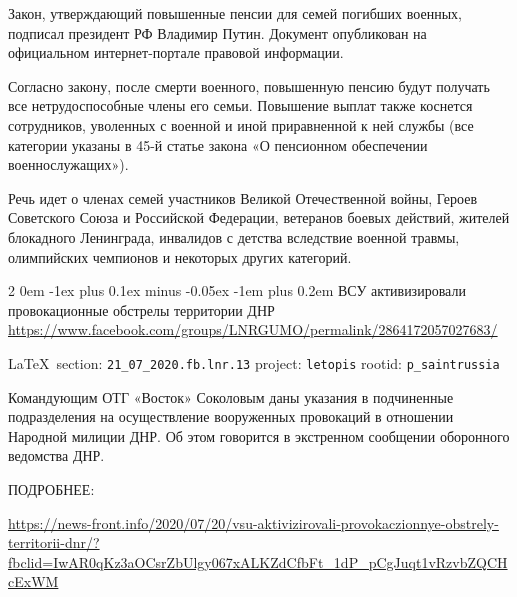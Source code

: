 \documentclass[a4paper,11pt]{extreport}
\makeatletter
\renewcommand\subsection{%
  \clearpage
    \@startsection{subsection}%
    {2}%
    {0em}%
    {-1ex plus 0.1ex minus -0.05ex}%
    {-1em plus 0.2em}%
    {\scshape\bfseries\Large}%
}
\makeatother
\begin{document}
Закон, утверждающий повышенные пенсии для семей погибших военных, подписал
президент РФ Владимир Путин. Документ опубликован на официальном
интернет-портале правовой информации.

Согласно закону, после смерти военного, повышенную пенсию будут получать все
нетрудоспособные члены его семьи.  Повышение выплат также коснется сотрудников,
уволенных с военной и иной приравненной к ней службы (все категории указаны в
45-й статье закона «О пенсионном обеспечении военнослужащих»).

Речь идет о членах семей участников Великой Отечественной войны, Героев
Советского Союза и Российской Федерации, ветеранов боевых действий, жителей
блокадного Ленинграда, инвалидов с детства вследствие военной травмы,
олимпийских чемпионов и некоторых других категорий.
  
 
 

\subsection{ВСУ активизировали провокационные обстрелы территории ДНР}
\label{sec:21_07_2020.fb.lnr.13}
\url{https://www.facebook.com/groups/LNRGUMO/permalink/2864172057027683/}
  
\vspace{0.5cm}
{\small\LaTeX~section: \verb|21_07_2020.fb.lnr.13| project: \verb|letopis| rootid: \verb|p_saintrussia|}
\vspace{0.5cm}

Командующим ОТГ «Восток» Соколовым даны указания в подчиненные подразделения на
осуществление вооруженных провокаций в отношении Народной милиции ДНР. Об этом
говорится в экстренном сообщении оборонного ведомства ДНР.

ПОДРОБНЕЕ: 

\url{https://news-front.info/2020/07/20/vsu-aktivizirovali-provokaczionnye-obstrely-territorii-dnr/?fbclid=IwAR0qKz3aOCsrZbUlgy067xALKZdCfbFt_1dP_pCgJuqt1vRzvbZQCHcExWM}
  
 
\end{document}
